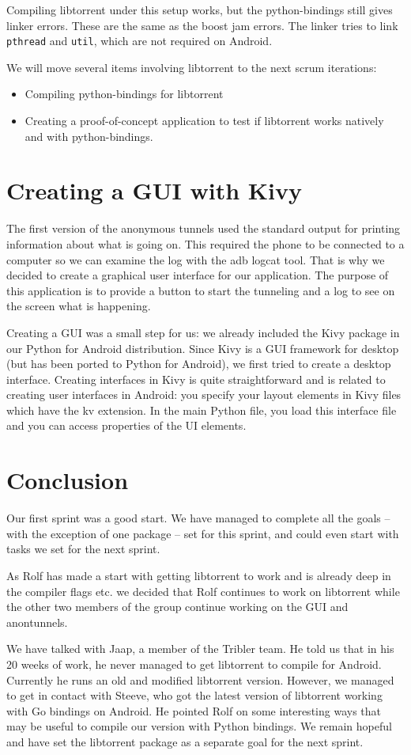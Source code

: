 		Compiling libtorrent under this setup works, but the python-bindings still gives linker errors. These are the same as the boost jam errors. The linker tries to link \texttt{pthread} and \texttt{util}, which are not required on Android.
		
		We will move several items involving libtorrent to the next scrum iterations:
		\begin{itemize}
		\item Compiling python-bindings for libtorrent
		\item Creating a proof-of-concept application to test if libtorrent works natively and with python-bindings.
		\end{itemize}
	
	\section{Creating a GUI with Kivy}
		The first version of the anonymous tunnels used the standard output for printing information about what is going on. This required the phone to be connected to a computer so we can examine the log with the adb logcat tool. That is why we decided to create a graphical user interface for our application. The purpose of this application is to provide a button to start the tunneling and a log to see on the screen what is happening.
	
		Creating a GUI was a small step for us: we already included the Kivy package in our Python for Android distribution. Since Kivy is a GUI framework for desktop (but has been ported to Python for Android), we first tried to create a desktop interface. Creating interfaces in Kivy is quite straightforward and is related to creating user interfaces in Android: you specify your layout elements in Kivy files which have the kv extension. In the main Python file, you load this interface file and you can access properties of the UI elements.
	
	\section{Conclusion}
		Our first sprint was a good start. We have managed to complete all the goals -- with the exception of one package -- set for this sprint, and could even start with tasks we set for the next sprint.
		
		As Rolf has made a start with getting libtorrent to work and is already deep in the compiler flags etc. we decided that Rolf continues to work on libtorrent while the other two members of the group continue working on the GUI and anontunnels.
		
		We have talked with Jaap, a member of the Tribler team. He told us that in his 20 weeks of work, he never managed to get libtorrent to compile for Android.
		Currently he runs an old and modified libtorrent version. However, we managed to get in contact with Steeve, who got the latest version of libtorrent working with Go bindings on Android. He pointed Rolf on some interesting ways that may be useful to compile our version with Python bindings. We remain hopeful and have set the libtorrent package as a separate goal for the next sprint.
